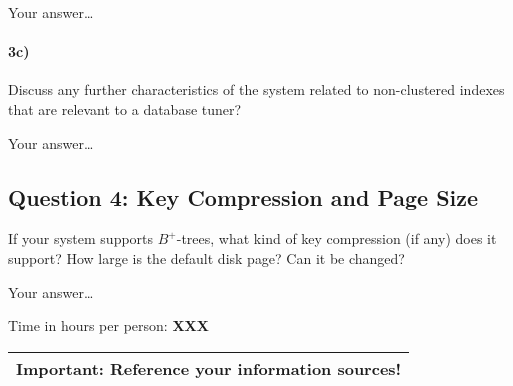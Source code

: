\documentclass[11pt]{scrartcl}
\begin{document}
Your answer\dots

\paragraph{3c)} Discuss any further characteristics of the system related to
non-clustered indexes that are relevant to a database tuner?

\smallskip

Your answer\dots

\subsection*{Question 4: Key Compression and Page Size} If your system
supports $B^+$-trees, what kind of key compression (if any) does it
support?  How large is the default disk page? Can it be changed?


\smallskip

Your answer\dots


\bigskip

\noindent Time in hours per person: {\bf XXX}

\bigskip

\begin{center}
  \begin{tabular}{c}
    \hline
    {\bf Important:} Reference your information sources!
    \\\hline
  \end{tabular}
\end{center}
\end{document}
